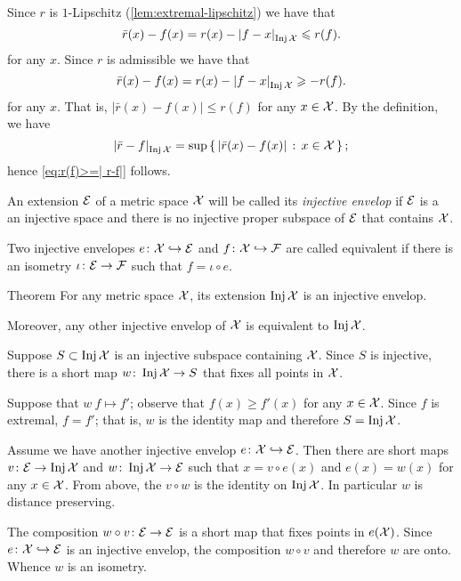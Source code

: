 Since $r$ is $1$-Lipschitz (\ref{lem:extremal-lipschitz}) we have that
\[
\bar r(x)-f(x)=r(x)-\dist{f}{x}{\Inj \spc{X}}\le r(f).
\]
for any $x$.
Since $r$ is admissible we have that
\[
\bar r(x)-f(x)=r(x)-\dist{f}{x}{\Inj \spc{X}}\ge -r(f).
\]
for any $x$.
That is, $|\bar r(x)-f(x)|\le r(f)$ for any $x\in \mathcal{X}$.
By the definition, we have
\[\dist{\bar r}{f}{\Inj \spc{X}}=\sup\set{|\bar r(x)-f(x)|}{x\in\spc{X}};\] 
hence \ref{eq:r(f)>=| r-f|} follows.
\qeds

An extension $\mathcal{E}$ of a metric space $\mathcal{X}$ will be called its \emph{injective envelop} if $\mathcal{E}$ is a an injective space and there is no injective proper subspace of $\mathcal{E}$ that contains $\mathcal{X}$.

Two injective envelopes $e\colon\mathcal{X}\hookrightarrow \mathcal{E}$ and $f\colon\mathcal{X}\hookrightarrow \mathcal{F}$ are called  equivalent if there is an isometry $\iota\colon \mathcal{E}\to\mathcal{F}$ such that $f=\iota\circ e$.

\begin{thm}{Theorem}
For any metric space $\mathcal{X}$, its extension $\mathop{\rm Inj}\nolimits\mathcal{X}$ is an injective envelop.

Moreover, any other injective envelop of $\mathcal{X}$ is equivalent to $\mathop{\rm Inj}\nolimits\mathcal{X}$.
\end{thm}

Suppose $S\subset \mathop{\rm Inj}\nolimits\mathcal{X}$ is an injective subspace containing $\mathcal{X}$.
Since $S$ is injective, there is a short map $w\colon\mathop{\rm Inj}\nolimits\mathcal{X}\to S$ that fixes all points in $\mathcal{X}$.

Suppose that $w\:f\mapsto f'$; observe that $f(x)\ge f'(x)$ for any $x\in \mathcal{X}$.
Since $f$ is extremal, $f=f'$;
that is, $w$ is the identity map and therefore $S=\mathop{\rm Inj}\nolimits\mathcal{X}$.

Assume we have another injective envelop $e\colon\mathcal{X}\hookrightarrow \mathcal{E}$.
Then there are short maps $v\colon\mathcal{E}\to \mathop{\rm Inj}\nolimits\mathcal{X}$ and $w\colon\mathop{\rm Inj}\nolimits\mathcal{X}\to \mathcal{E}$ such that $x=v\circ e(x)$ and $e(x)=w(x)$ for any $x\in\mathcal{X}$.
From above, the $v\circ w$ is the identity on $\mathop{\rm Inj}\nolimits\mathcal{X}$.
In particular $w$ is distance preserving.

The composition $w\circ v\colon\mathcal{E}\to \mathcal{E}$ is a short map that fixes points in $e(\mathcal{X})$.
Since $e\colon\mathcal{X}\hookrightarrow \mathcal{E}$ is an injective envelop, the composition $w\circ v$ and therefore $w$ are onto.
Whence $w$ is an isometry.
\qeds




